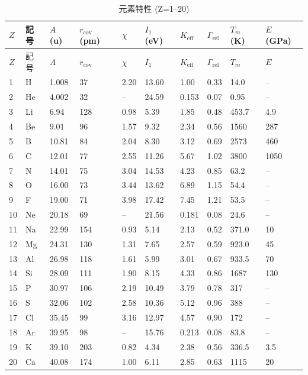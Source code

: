 \documentclass[11pt,a4paper]{article}
\newcommand{\Keff}{K_{\mathrm{eff}}}
\theoremstyle{remark}
\begin{document}
	\begin{longtable}{p{0.6cm}p{1.2cm}p{1.2cm}p{1.2cm}p{1.2cm}p{1.2cm}p{1.5cm}p{1.2cm}p{1.2cm}p{1.2cm}}
		\caption{元素特性 (Z=1–20)} \label{tab:elem-data-first20} \\
		\toprule
		\(Z\) & 記号 & \(A\) (u) & \(r_{\text{cov}}\) (pm) & \(\chi\) & \(I_1\) (eV) & \(\Keff\) & \(\Gamma_{\text{rel}}\) & \(T_m\) (K) & \(E\) (GPa) \\
		\midrule
		\endfirsthead
		\toprule
		\(Z\) & 記号 & \(A\) & \(r_{\text{cov}}\) & \(\chi\) & \(I_1\) & \(\Keff\) & \(\Gamma_{\text{rel}}\) & \(T_m\) & \(E\) \\
		\midrule
		\endhead
		1  & H  & 1.008  & 37   & 2.20 & 13.60 & 1.00  & 0.33  & 14.0  & – \\
		2  & He & 4.002  & 32   & –    & 24.59 & 0.153 & 0.07  & 0.95  & – \\
		3  & Li & 6.94   & 128  & 0.98 & 5.39  & 1.85  & 0.48  & 453.7 & 4.9 \\
		4  & Be & 9.01   & 96   & 1.57 & 9.32  & 2.34  & 0.56  & 1560  & 287 \\
		5  & B  & 10.81  & 84   & 2.04 & 8.30  & 3.12  & 0.69  & 2573  & 460\footnotemark \\
		6  & C  & 12.01  & 77   & 2.55 & 11.26 & 5.67  & 1.02  & 3800  & 1050\footnotemark \\
		7  & N  & 14.01  & 75   & 3.04 & 14.53 & 4.23  & 0.85  & 63.2  & – \\
		8  & O  & 16.00  & 73   & 3.44 & 13.62 & 6.89  & 1.15  & 54.4  & – \\
		9  & F  & 19.00  & 71   & 3.98 & 17.42 & 7.45  & 1.21  & 53.5  & – \\
		10 & Ne & 20.18  & 69   & –    & 21.56 & 0.181 & 0.08  & 24.6  & – \\
		11 & Na & 22.99  & 154  & 0.93 & 5.14  & 2.13  & 0.52  & 371.0 & 10 \\
		12 & Mg & 24.31  & 130  & 1.31 & 7.65  & 2.57  & 0.59  & 923.0 & 45 \\
		13 & Al & 26.98  & 118  & 1.61 & 5.99  & 3.01  & 0.67  & 933.5 & 70 \\
		14 & Si & 28.09  & 111  & 1.90 & 8.15  & 4.33  & 0.86  & 1687  & 130 \\
		15 & P  & 30.97  & 106  & 2.19 & 10.49 & 3.79  & 0.78  & 317   & – \\
		16 & S  & 32.06  & 102  & 2.58 & 10.36 & 5.12  & 0.96  & 388   & – \\
		17 & Cl & 35.45  & 99   & 3.16 & 12.97 & 4.57  & 0.90  & 172   & – \\
		18 & Ar & 39.95  & 98   & –    & 15.76 & 0.213 & 0.08  & 83.8  & – \\
		19 & K  & 39.10  & 203  & 0.82 & 4.34  & 2.38  & 0.56  & 336.5 & 3.5 \\
		20 & Ca & 40.08  & 174  & 1.00 & 6.11  & 2.85  & 0.63  & 1115  & 20 \\
		\bottomrule
	\end{longtable}
\end{document}
